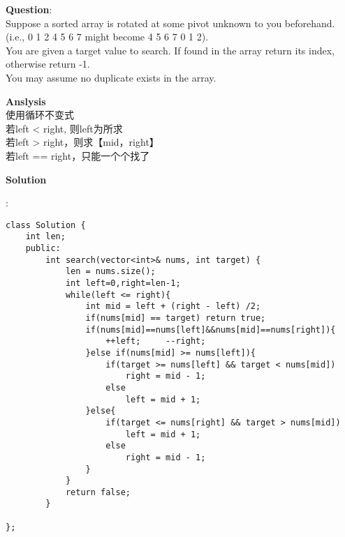 \begin{description}
    \item{\textbf{Question}}:\\%
		Suppose a sorted array is rotated at some pivot unknown to you beforehand.\\
		(i.e., 0 1 2 4 5 6 7 might become 4 5 6 7 0 1 2).\\
		You are given a target value to search. If found in the array return its index, otherwise return -1.\\
		You may assume no duplicate exists in the array.\\

    \item{\textbf{Anslysis}}\\
		使用循环不变式\\
		若left < right, 则left为所求\\
		若left > right，则求【mid，right】\\
		若left == right，只能一个个找了\\

    \item{\textbf{Solution}}\\
	\item{} : \\
		\begin{lstlisting}
class Solution {
	int len;
	public:
		int search(vector<int>& nums, int target) {
			len = nums.size();
			int left=0,right=len-1;
			while(left <= right){
				int mid = left + (right - left) /2;
				if(nums[mid] == target)	return true;
				if(nums[mid]==nums[left]&&nums[mid]==nums[right]){
					++left;		--right;
				}else if(nums[mid] >= nums[left]){
					if(target >= nums[left] && target < nums[mid])
						right = mid - 1;
					else 
						left = mid + 1;
				}else{
					if(target <= nums[right] && target > nums[mid])
						left = mid + 1;
					else 
						right = mid - 1;
				}
			}
			return false;
		}

};
		\end{lstlisting}
\end{description}

